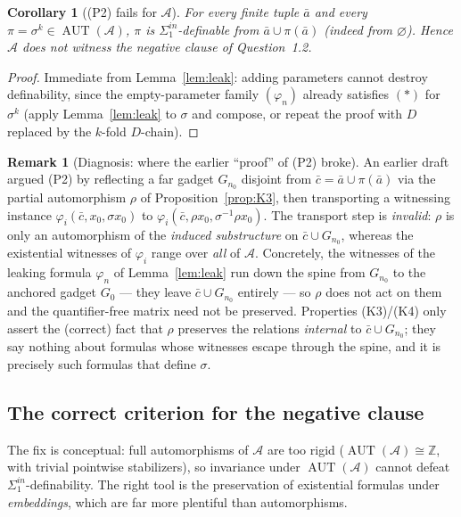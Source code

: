\documentclass[12pt,fullpage]{article}
\newtheorem{corollary}[theorem]{Corollary}
\theoremstyle{definition}
\newtheorem{remark}[theorem]{Remark}
\newcommand{\A}{\mathcal{A}}
\newcommand{\Z}{{\mathbb{Z}}}
\newcommand{\AUT}{\operatorname{AUT}}
\renewcommand{\phi}{\varphi}
\begin{document}
\begin{corollary}[(P2) fails for $\A$]\label{cor:P2-fails}
For every finite tuple $\bar a$ and every $\pi=\sigma^k\in\AUT(\A)$, $\pi$
\emph{is} $\Sigma^{in}_1$-definable from $\bar a\cup\pi(\bar a)$ (indeed from
$\varnothing$).  Hence $\A$ does not witness the negative clause of
Question~1.2.
\end{corollary}

\begin{proof}
Immediate from Lemma~\ref{lem:leak}: adding parameters cannot destroy
definability, since the empty-parameter family $(\phi_n)$ already satisfies
$(\ast)$ for $\sigma^k$ (apply Lemma~\ref{lem:leak} to $\sigma$ and compose, or
repeat the proof with $D$ replaced by the $k$-fold $D$-chain).
\end{proof}

\begin{remark}[Diagnosis: where the earlier ``proof'' of (P2) broke]\label{rem:diagnosis}
An earlier draft argued (P2) by reflecting a far gadget $G_{n_0}$ disjoint
from $\bar c=\bar a\cup\pi(\bar a)$ via the partial automorphism $\rho$ of
Proposition~\ref{prop:K3}, then transporting a witnessing instance
$\phi_i(\bar c,x_0,\sigma x_0)$ to $\phi_i(\bar c,\rho x_0,\sigma^{-1}\rho x_0)$.
The transport step is \emph{invalid}: $\rho$ is only an automorphism of the
\emph{induced substructure} on $\bar c\cup G_{n_0}$, whereas the existential
witnesses of $\phi_i$ range over \emph{all} of $\A$.  Concretely, the
witnesses of the leaking formula $\phi_n$ of Lemma~\ref{lem:leak} run down the
spine from $G_{n_0}$ to the anchored gadget $G_0$ --- they leave
$\bar c\cup G_{n_0}$ entirely --- so $\rho$ does not act on them and the
quantifier-free matrix need not be preserved.  Properties (K3)/(K4) only assert
the (correct) fact that $\rho$ preserves the relations \emph{internal} to
$\bar c\cup G_{n_0}$; they say nothing about formulas whose witnesses escape
through the spine, and it is precisely such formulas that define $\sigma$.
\end{remark}

\subsection*{The correct criterion for the negative clause}

The fix is conceptual: full automorphisms of $\A$ are too rigid
($\AUT(\A)\cong\Z$, with trivial pointwise stabilizers), so invariance under
$\AUT(\A)$ cannot defeat $\Sigma^{in}_1$-definability.  The right tool is the
preservation of existential formulas under \emph{embeddings}, which are far
more plentiful than automorphisms.
\end{document}
